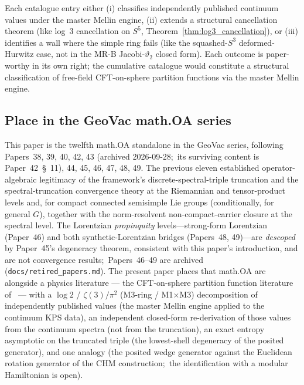 \documentclass[11pt,a4paper]{article}
\theoremstyle{plain}
\theoremstyle{definition}
\newcommand{\sthree}{S^{3}}
\begin{document}
Each catalogue entry either (i) classifies independently published
continuum values under the master Mellin engine, (ii) extends a structural cancellation
theorem (like log~3 cancellation on $S^{5}$,
Theorem~\ref{thm:log3_cancellation}), or (iii) identifies a wall
where the simple ring fails (like the squashed-$\sthree$ deformed-Hurwitz
case, not in the MR-B Jacobi-$\vartheta_{2}$ closed form). Each outcome is paper-worthy
in its own right; the cumulative catalogue would constitute a
structural classification of free-field CFT-on-sphere partition
functions via the master Mellin engine.

\subsection{Place in the GeoVac math.OA series}

This paper is the twelfth math.OA standalone in the GeoVac series,
following Papers~38, 39, 40, 42, 43 (archived 2026-09-28;\ its surviving
content is Paper~42~\S~11), 44, 45, 46, 47, 48, 49.
The previous eleven established operator-algebraic legitimacy of the
framework's discrete-spectral-triple truncation and the spectral-truncation
convergence theory at the Riemannian and tensor-product levels and, for
compact connected semisimple Lie groups (conditionally, for general $G$), together with the norm-resolvent
non-compact-carrier closure at the spectral level.  The Lorentzian
\emph{propinquity} levels---strong-form Lorentzian (Paper~46) and both
synthetic-Lorentzian bridges (Papers~48, 49)---are \emph{descoped} by
Paper~45's degeneracy theorem, consistent with this paper's introduction,
and are not convergence results;\ Papers~46--49 are archived
(\texttt{docs/retired\_papers.md}). The present paper places that math.OA
arc alongside a physics literature --- the CFT-on-sphere partition function
literature
of~\cite{cardy1988, jafferis_klebanov_pufu_safdi2011,
klebanov_pufu_safdi2011, beccaria_bekaert_tseytlin2014,
lei_van_leuven2024} --- with a $\log 2$ / $\zeta(3)/\pi^{2}$ (M3-ring /
M1$\times$M3) decomposition of independently published values (the master Mellin engine applied to the continuum KPS
data), an independent closed-form re-derivation of those values from the
continuum spectra (not from the truncation), an exact entropy asymptotic
on the truncated triple (the lowest-shell degeneracy of the posited
generator), and one analogy (the posited wedge generator
against the Euclidean rotation generator of the CHM construction;\ the
identification with a modular Hamiltonian is open).
\end{document}
